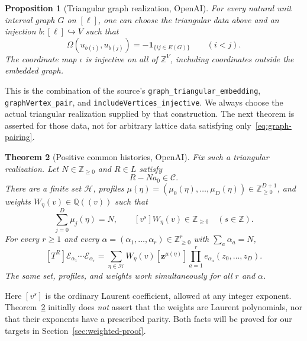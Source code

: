 \documentclass[11pt,reqno]{amsart}
\newcommand{\NN}{\mathbb Z_{\geq0}}
\newcommand{\ZZ}{\mathbb Z}
\newcommand{\QQ}{\mathbb Q}
\newcommand{\zz}{\mathbf z}
\newcommand{\EE}{\mathscr E}
\newcommand{\CC}{\mathscr C}
\newcommand{\HH}{\mathcal H}
\newcommand{\one}{\mathbf 1}
\newcommand{\decl}[1]{\nolinkurl{#1}}
\newtheorem{theorem}{Theorem}[section]
\newtheorem{proposition}[theorem]{Proposition}
\theoremstyle{definition}
\theoremstyle{remark}
\numberwithin{equation}{section}
\begin{document}
\begin{proposition}[Triangular graph realization, OpenAI]\label{prop:embedding}
For every natural unit interval graph $G$ on $[\ell]$, one can choose
the triangular data above and an injection $b:[\ell]\hookrightarrow V$
such that
\begin{equation}\label{eq:graph-pairing}
 \Omega(u_{b(i)},u_{b(j)})
   =-\one_{\{ij\in E(G)\}}\qquad(i<j).
\end{equation}
The coordinate map $\iota$ is injective on all of $\ZZ^V$, including
coordinates outside the embedded graph.
\end{proposition}

This is the combination of the source's
\decl{graph_triangular_embedding}, \decl{graphVertex_pair}, and
\decl{includeVertices_injective}.  We always choose the actual
triangular realization supplied by that construction.  The next
theorem is asserted for those data, not for arbitrary lattice data
satisfying only~\eqref{eq:graph-pairing}.

\begin{theorem}[Positive common histories, OpenAI]\label{thm:input}
Fix such a triangular realization.  Let $N\in\NN$ and $R\in L$ satisfy
\begin{equation}\label{eq:root-hyp}
 R-Na_0\in\CC.
\end{equation}
There are a finite set $\HH$, profiles
$\mu(\eta)=(\mu_0(\eta),\ldots,\mu_D(\eta))\in\NN^{D+1}$, and weights
$W_\eta(v)\in\QQ((v))$ such that
\begin{equation}\label{eq:profiles}
 \sum_{j=0}^D\mu_j(\eta)=N,\qquad
 [v^s]W_\eta(v)\in\mathbb Z_{\geq0}\quad(s\in\ZZ).
\end{equation}
For every $r\geq1$ and every $\alpha=(\alpha_1,\ldots,\alpha_r)\in\NN^r$
with $\sum_a\alpha_a=N$,
\begin{equation}\label{eq:history}
 [T^R]\EE_{\alpha_1}\cdots\EE_{\alpha_r}
  =\sum_{\eta\in\HH}W_\eta(v)
       [\zz^{\mu(\eta)}]\prod_{a=1}^r e_{\alpha_a}(z_0,\ldots,z_D).
\end{equation}
The same set, profiles, and weights work simultaneously for all $r$
and $\alpha$.
\end{theorem}

Here $[v^s]$ is the ordinary Laurent coefficient, allowed at any
integer exponent.  Theorem~\ref{thm:input} initially does \emph{not}
assert that the weights are Laurent polynomials, nor that their
exponents have a prescribed parity.  Both facts will be proved for
our targets in Section~\ref{sec:weighted-proof}.
\end{document}
